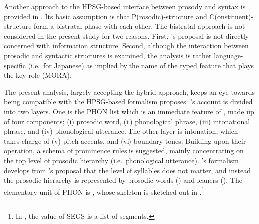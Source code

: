 Another approach to the HPSG-based interface between prosody and
syntax is provided in \citet{yoshimoto:00}. Its basic
assumption is that P(rosodic)-structure and C(onstituent)-structure
form a bistratal phase with each other. The bistratal approach is not
considered in the present study for two reasons. First,
\citeauthor{yoshimoto:00}'s proposal is not directly concerned with
information structure. Second, although the interaction between
prosodic and syntactic structures is examined, the analysis is rather
language-specific (i.e.\ for Japanese) as implied by the name of the
typed feature that plays the key role (MORA).



The present analysis, largely accepting the hybrid approach, keeps an
eye towards being compatible with the HPSG-based formalism
\citet{bildhauer:07} proposes.  \citeauthor{bildhauer:07}'s account is
divided into two layers. One is the PHON list which is an immediate
feature of , made up of four components; (i) prosodic word,
(ii) phonological phrase, (iii) intonational phrase, and (iv)
phonological utterance. The other layer is intonation, which takes
charge of (v) pitch accents, and (vi) boundary
tones. Building upon their operation, a schema of  prominence
rules is suggested, mainly concentrating on the top level of prosodic
hierarchy (i.e.\ phonological utterance). \citeauthor{bildhauer:07}'s
formalism develops from \citeauthor{klein:00}'s proposal that the
level of syllables does not matter, and instead the prosodic hierarchy
is represented by prosodic words () and leaners
(). The elementary unit of PHON is , whose skeleton
is sketched out in 
\citep[161]{bildhauer:07}.\footnote{In
  , the value of SEGS is a list of
  segments.}


